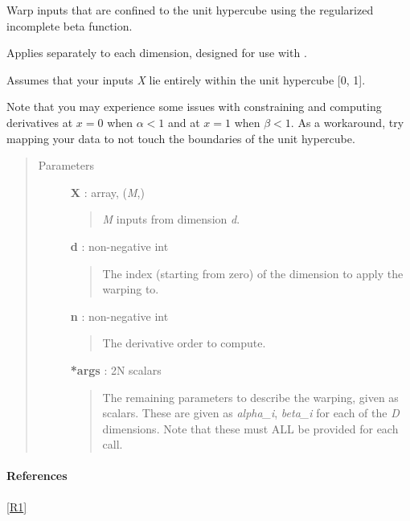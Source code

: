 \documentclass[letterpaper,10pt,english]{sphinxmanual}
\begin{document}
\begin{fulllineitems}
\label{gptools.kernel:gptools.kernel.warping.beta_cdf_warp}
Warp inputs that are confined to the unit hypercube using the regularized incomplete beta function.

Applies separately to each dimension, designed for use with
{\hyperref[gptools.kernel:gptools.kernel.warping.WarpingFunction]{}}.

Assumes that your inputs \emph{X} lie entirely within the unit hypercube {[}0, 1{]}.

Note that you may experience some issues with constraining and computing
derivatives at \(x=0\) when \(\alpha < 1\) and at \(x=1\) when
\(\beta < 1\). As a workaround, try mapping your data to not touch the
boundaries of the unit hypercube.
\begin{quote}\begin{description}
\item[{Parameters}] \leavevmode
\textbf{X} : array, (\emph{M},)
\begin{quote}

\emph{M} inputs from dimension \emph{d}.
\end{quote}

\textbf{d} : non-negative int
\begin{quote}

The index (starting from zero) of the dimension to apply the warping to.
\end{quote}

\textbf{n} : non-negative int
\begin{quote}

The derivative order to compute.
\end{quote}

\textbf{*args} : 2N scalars
\begin{quote}

The remaining parameters to describe the warping, given as scalars.
These are given as \emph{alpha\_i}, \emph{beta\_i} for each of the \emph{D} dimensions.
Note that these must ALL be provided for each call.
\end{quote}

\end{description}\end{quote}
\paragraph{References}

{\hyperref[gptools.kernel:r1]{{[}R1{]}}}

\end{fulllineitems}
\end{document}
